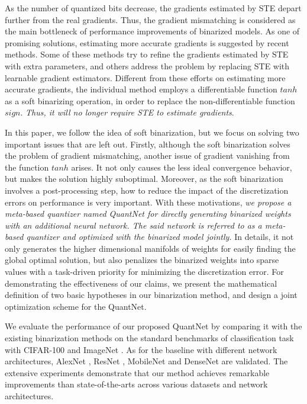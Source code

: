 \documentclass[runningheads]{llncs}
\begin{document}
As the number of quantized bits decrease,
the gradients estimated by STE depart further from the real gradients.
Thus, the gradient mismatching is considered as the main bottleneck of performance improvements of binarized models.
As one of promising solutions, estimating more accurate gradients is suggested by recent methods.
Some of these methods \cite{Liu2018Enhance,Wang2018Twostep,blended_grad2018,Uhlich2019DQ}
try to refine the gradients estimated by STE with extra parameters,
and others \cite{bai2019prox,chen2019meta} address the problem
by replacing STE with learnable gradient estimators.
Different from these efforts on estimating more accurate gradients,
the individual method \cite{lahoud2019self} employs a differentiable function $tanh$ as a soft binarizing operation,
in order to replace the non-differentiable function $sign$.
\emph{Thus, it will no longer require STE to estimate gradients}.

In this paper, we follow the idea of soft binarization,
but we focus on solving two important issues that are left out.
Firstly, although the soft binarization solves the problem of gradient mismatching,
another issue of gradient vanishing from the function $tanh$ arises.
It not only causes the less ideal convergence behavior, but makes the solution highly suboptimal.
Moreover, as the soft binarization involves a post-processing step,
how to reduce the impact of the discretization errors on performance is very important.
With these motivations, \emph{we propose a meta-based quantizer named QuantNet
for directly generating binarized weights with an additional neural network.
The said network is referred to as a meta-based quantizer and optimized with the binarized model jointly.}
In details, it not only generates the higher dimensional manifolds of weights for easily finding the global optimal solution,
but also penalizes the binarized weights into sparse values with a task-driven priority for minimizing the discretization error.
For demonstrating the effectiveness of our claims,
we present the mathematical definition of two basic hypotheses in our binarization method,
and design a joint optimization scheme for the QuantNet.

We evaluate the performance of our proposed QuantNet by comparing it with the existing binarization methods
on the standard benchmarks of classification task with
CIFAR-100 \cite{cifar10} and ImageNet \cite{Deng2009}.
As for the baseline with different network architectures,
AlexNet \cite{Krizhevsky2012}, ResNet \cite{he2016deep},
MobileNet \cite{sandler2018mobilenetv2} and DenseNet \cite{denseNet2017} are validated.
The extensive experiments demonstrate that our method achieves remarkable improvements
than state-of-the-arts across various datasets and network architectures.
\end{document}
